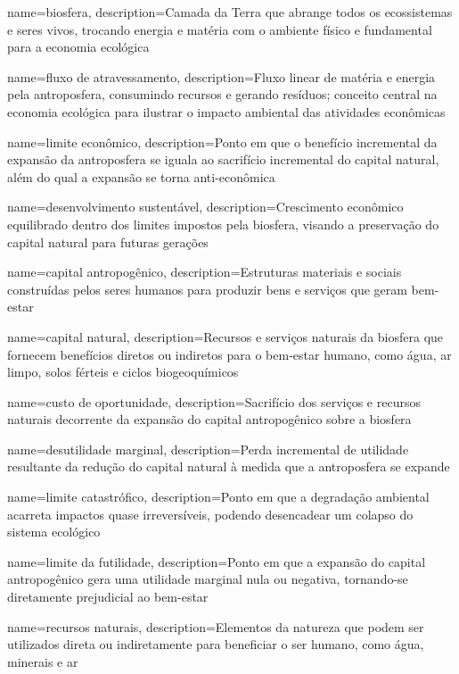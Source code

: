 {
	name=biosfera,
	description={Camada da Terra que abrange todos os ecossistemas e seres vivos, trocando energia e matéria com o ambiente físico e fundamental para a economia ecológica}
}

{
	name=fluxo de atravessamento,
	description={Fluxo linear de matéria e energia pela antroposfera, consumindo recursos e gerando resíduos; conceito central na economia ecológica para ilustrar o impacto ambiental das atividades econômicas}
}


{
	name=limite econômico,
	description={Ponto em que o benefício incremental da expansão da antroposfera se iguala ao sacrifício incremental do capital natural, além do qual a expansão se torna anti-econômica}
}

{
	name=desenvolvimento sustentável,
	description={Crescimento econômico equilibrado dentro dos limites impostos pela biosfera, visando a preservação do capital natural para futuras gerações}
}

{
	name=capital antropogênico,
	description={Estruturas materiais e sociais construídas pelos seres humanos para produzir bens e serviços que geram bem-estar}
}

{
	name=capital natural,
	description={Recursos e serviços naturais da biosfera que fornecem benefícios diretos ou indiretos para o bem-estar humano, como água, ar limpo, solos férteis e ciclos biogeoquímicos}
}

{
	name=custo de oportunidade,
	description={Sacrifício dos serviços e recursos naturais decorrente da expansão do capital antropogênico sobre a biosfera}
}

{
	name=desutilidade marginal,
	description={Perda incremental de utilidade resultante da redução do capital natural à medida que a antroposfera se expande}
}

{
	name=limite catastrófico,
	description={Ponto em que a degradação ambiental acarreta impactos quase irreversíveis, podendo desencadear um colapso do sistema ecológico}
}

{
	name=limite da futilidade,
	description={Ponto em que a expansão do capital antropogênico gera uma utilidade marginal nula ou negativa, tornando-se diretamente prejudicial ao bem-estar}
}

{
	name=recursos naturais,
	description={Elementos da natureza que podem ser utilizados direta ou indiretamente para beneficiar o ser humano, como água, minerais e ar}
}

